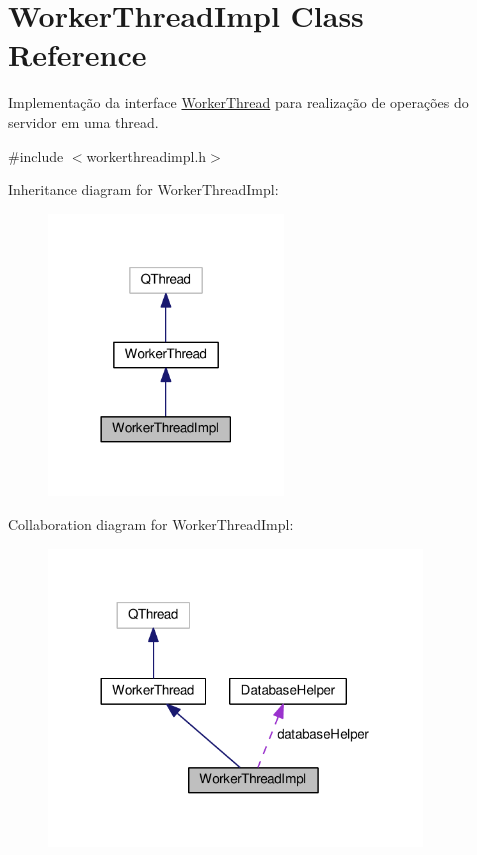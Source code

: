\hypertarget{classWorkerThreadImpl}{}\section{Worker\+Thread\+Impl Class Reference}
\label{classWorkerThreadImpl}


Implementação da interface \hyperlink{classWorkerThread}{Worker\+Thread} para realização de operações do servidor em uma thread.  




{\ttfamily \#include $<$workerthreadimpl.\+h$>$}



Inheritance diagram for Worker\+Thread\+Impl\+:\nopagebreak
\begin{figure}[H]
\begin{center}
\leavevmode
\includegraphics[width=177pt]{d6/d44/classWorkerThreadImpl__inherit__graph}
\end{center}
\end{figure}


Collaboration diagram for Worker\+Thread\+Impl\+:\nopagebreak
\begin{figure}[H]
\begin{center}
\leavevmode
\includegraphics[width=281pt]{de/d29/classWorkerThreadImpl__coll__graph}
\end{center}
\end{figure}
